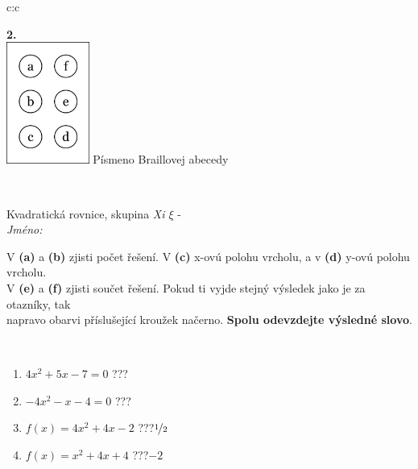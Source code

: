 \documentclass[10pt]{report}
\begin{document}
\begin{tabular}{c:c}
\begin{minipage}[c][104.5mm][t]{0.5\linewidth}
\begin{center}
\begin{minipage}{0.20\linewidth}
\begin{center}
{\Huge\bfseries 2.} \\[2mm]
\includegraphics[height=40mm]{../images/braille.png}
{\small Písmeno Braillovej abecedy}
\end{center}
\end{minipage}
\end{center}
\end{minipage}
\\ \hdashline
\begin{minipage}[c][104.5mm][t]{0.5\linewidth}
\begin{center}
\vspace{7mm}
{\huge Kvadratická rovnice, skupina \textit{Xi $\xi$} -}\\[5mm]
\textit{Jméno:}\phantom{xxxxxxxxxxxxxxxxxxxxxxxxxxxxxxxxxxxxxxxxxxxxxxxxxxxxxxxxxxxxxxxxx}\\[5mm]
\begin{minipage}{0.95\linewidth}
\begin{center}
V \textbf{(a)} a \textbf{(b)} zjisti počet řešení. V \textbf{(c)} x-ovú polohu vrcholu, a v \textbf{(d)} y-ovú polohu vrcholu.\\V \textbf{(e)} a \textbf{(f)} zjisti součet řešení. Pokud ti vyjde stejný výsledek jako je za otazníky, tak\\napravo obarvi příslušející kroužek načerno. \textbf{Spolu odevzdejte výsledné slovo}.
\end{center}
\end{minipage}
\\[1mm]
\begin{minipage}{0.79\linewidth}
\begin{center}
\begin{varwidth}{\linewidth}
\begin{enumerate}
\Large
\item $4x^2+5x-7=0$\quad \dotfill\; ???\;\dotfill {}
\item $-4x^2-x-4=0$\quad \dotfill\; ???\;\dotfill {}
\item $f(x)=4x^2+4x-2$\quad \dotfill\; ???\;\dotfill \quad $\nicefrac{1}{2}$
\item $f(x)=x^2+4x+4$\quad \dotfill\; ???\;\dotfill \quad $-2$

\end{enumerate}
\end{varwidth}
\end{center}
\end{minipage}
\end{center}
\end{minipage}
\end{tabular}
\end{document}
